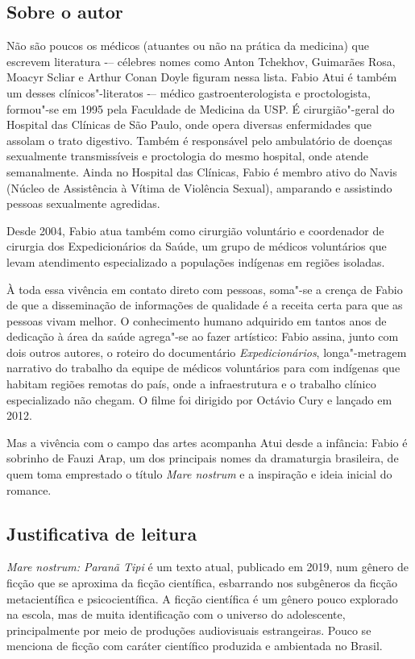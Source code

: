 \documentclass[12pt]{extarticle}
\begin{document}
\subsection{Sobre o autor}

Não são poucos os médicos (atuantes ou não na prática da medicina) que escrevem literatura -– célebres nomes como Anton Tchekhov, Guimarães Rosa, Moacyr Scliar e Arthur Conan Doyle figuram nessa lista. Fabio Atui é também um desses clínicos"-literatos -– médico gastroenterologista e proctologista, formou"-se em 1995 pela Faculdade de Medicina da USP. É cirurgião"-geral do Hospital das Clínicas de São Paulo, onde opera diversas enfermidades que assolam o trato digestivo. Também é responsável pelo ambulatório de doenças sexualmente transmissíveis e proctologia do mesmo hospital, onde atende semanalmente. Ainda no Hospital das Clínicas, Fabio é membro ativo do Navis (Núcleo de Assistência à Vítima de Violência Sexual), amparando e assistindo pessoas sexualmente agredidas.

Desde 2004, Fabio atua também como cirurgião voluntário e coordenador de cirurgia dos Expedicionários da Saúde, um grupo de médicos voluntários que levam atendimento especializado a populações indígenas em regiões isoladas. 




À toda essa vivência em contato direto com pessoas, soma"-se a crença de Fabio de que a disseminação de informações de qualidade é a receita certa para que as pessoas vivam melhor. O conhecimento humano adquirido em tantos anos de dedicação à área da saúde agrega"-se ao fazer artístico: Fabio assina, junto com dois outros autores, o roteiro do documentário \emph{Expedicionários}, longa"-metragem narrativo do trabalho da equipe de médicos voluntários para com indígenas que habitam regiões remotas do país, onde a infraestrutura e o trabalho clínico especializado não chegam. O filme foi dirigido por Octávio Cury e lançado em 2012. 

Mas a vivência com o campo das artes acompanha Atui desde a infância: Fabio é sobrinho de Fauzi Arap, um dos principais nomes da dramaturgia brasileira, de quem toma emprestado o título \emph{Mare nostrum} e a inspiração e ideia inicial do romance.

\subsection{Justificativa de leitura}
\textit{Mare nostrum: Paranã Tipi} é um texto atual, publicado em 2019, num
gênero de ficção que se aproxima da ficção científica, esbarrando nos
subgêneros da ficção metacientífica e psicocientífica. A ficção científica é um
gênero pouco explorado na escola, mas de muita identificação com o universo do
adolescente, principalmente por meio de produções audiovisuais estrangeiras.
Pouco se menciona de ficção com caráter científico produzida e ambientada no
Brasil.
\end{document}
